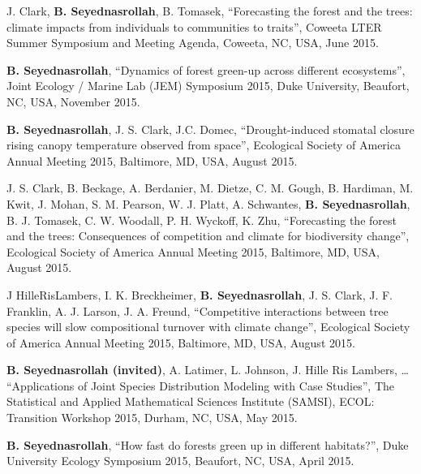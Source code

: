 \documentclass[10pt]{article}
\newenvironment{changemargin}[2]{%
  \begin{list}{}{%
 \setlength{\topsep}{0pt}%
 \setlength{\leftmargin}{#1}%
 \setlength{\rightmargin}{#2}%
 \setlength{\listparindent}{\parindent}%
 \setlength{\itemindent}{\parindent}%
 \setlength{\parsep}{\parskip}%
  }%
  \item[]}{\end{list}
}
\newenvironment{body} {
  \vspace*{-2pt}
  \begin{changemargin}{-0.5in}{-0.5in}
}
{\end{changemargin}
}
\begin{document}
\begin{body}
\begin{etaremune}
    \item J. Clark, \textbf {B. Seyednasrollah}, B.  Tomasek, ``Forecasting the forest and the trees: climate impacts from individuals to communities to traits'', Coweeta LTER Summer Symposium and Meeting Agenda, Coweeta, NC, USA, June 2015.\\
    \medskip

    \item \textbf{B. Seyednasrollah}, ``Dynamics of forest green-up across different ecosystems'', Joint Ecology / Marine Lab (JEM) Symposium 2015, Duke University, Beaufort, NC, USA, November 2015.\\
    \medskip

    \item \textbf{B. Seyednasrollah}, J. S. Clark, J.C. Domec, ``Drought-induced stomatal closure rising canopy temperature observed from space'', Ecological Society of America Annual Meeting 2015, Baltimore, MD, USA, August 2015.\\
    \medskip

    \item J. S. Clark, B. Beckage, A. Berdanier, M. Dietze, C. M. Gough, B. Hardiman, M. Kwit, J. Mohan, S. M. Pearson, W. J. Platt, A. Schwantes, \textbf{B. Seyednasrollah}, B. J. Tomasek, C. W. Woodall, P. H. Wyckoff, K. Zhu, ``Forecasting the forest and the trees: Consequences of competition and climate for biodiversity change'', Ecological Society of America Annual Meeting 2015, Baltimore, MD, USA, August 2015.\\
    \medskip

    \item J HilleRisLambers, I. K. Breckheimer, \textbf{B. Seyednasrollah}, J. S. Clark, J. F. Franklin, A. J. Larson, J. A. Freund, ``Competitive interactions between tree species will slow compositional turnover with climate change'', Ecological Society of America Annual Meeting 2015, Baltimore, MD, USA, August 2015.\\
    \medskip


    \item \textbf{B. Seyednasrollah (invited)}, A. Latimer, L. Johnson, J. Hille Ris Lambers, … ``Applications of Joint Species Distribution Modeling with Case Studies'', The Statistical and Applied Mathematical Sciences Institute (SAMSI), ECOL: Transition Workshop 2015, Durham, NC, USA, May 2015.\\
    \medskip

    \item \textbf{B. Seyednasrollah}, ``How fast do forests green up in different habitats?'', Duke University Ecology Symposium 2015, Beaufort, NC, USA, April 2015.\\
    \medskip



\end{etaremune}
\end{body}
\end{document}
